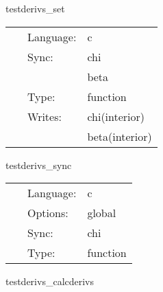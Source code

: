 \vspace{5mm}


\hspace{5mm} testderivs\_set 

\hspace{5mm}{\it set up test data } 


\hspace{5mm}

 \begin{tabular*}{160mm}{cll} 
~ & Language:  & c \\ 
~ & Sync:  & chi \\ 
~& ~ &beta\\ 
~ & Type:  & function \\ 
~ & Writes:  & chi(interior) \\ 
~& ~ &beta(interior)\\ 
\end{tabular*} 


\vspace{5mm}


\hspace{5mm} testderivs\_sync 

\hspace{5mm}{\it synchronize } 


\hspace{5mm}

 \begin{tabular*}{160mm}{cll} 
~ & Language:  & c \\ 
~ & Options:  & global \\ 
~ & Sync:  & chi \\ 
~ & Type:  & function \\ 
\end{tabular*} 


\vspace{5mm}


\hspace{5mm} testderivs\_calcderivs 

\hspace{5mm}{\it calculate derivs } 


\hspace{5mm}


